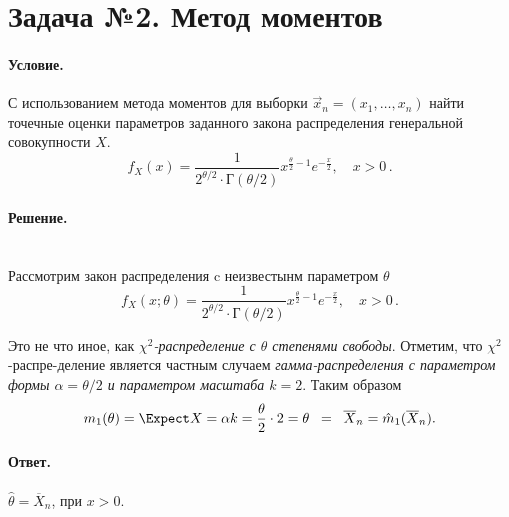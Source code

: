 
\section{Задача №2. Метод моментов}

\paragraph{Условие.} С использованием метода моментов для выборки $\vec{x}_n = (x_1, \dots, x_n)$ найти точечные оценки параметров заданного закона распределения генеральной совокупности $X$.
\[
    f_X (x) = \frac{1}{2^{\theta/2} \cdot \textsf{Г} (\theta/2)} x^{\frac{\theta}{2} - 1} e^{-\frac{x}{2}}, \quad x > 0\,.
\]

\paragraph{Решение.}\hfill\\

\noindent
Рассмотрим закон распределения c неизвестынм параметром $\theta$
\[
    f_X (x; \theta) = \frac{1}{2^{\theta/2} \cdot \textsf{Г} (\theta/2)} x^{\frac{\theta}{2} - 1} e^{-\frac{x}{2}}, \quad x > 0\,.
\]

\noindent
Это не что иное, как \emph{$\chi^2$-распределение с $\theta$ степенями свободы}. Отметим, что $\chi^2$-распре-деление является частным случаем \emph{гамма-распределения с параметром формы $\alpha = \theta/2$ и параметром масштаба $k = 2$}. Таким образом
\[
    m_1(\theta) = \Expect X = \alpha k = \frac{\theta}{2} \cdot 2 = \theta \;\; = \;\; \overline{X}_n = \hat{m}_1(\overline{X}_n).
\]

\paragraph{Ответ.} $\hat\theta = \overline{X}_n$, при $x > 0$.